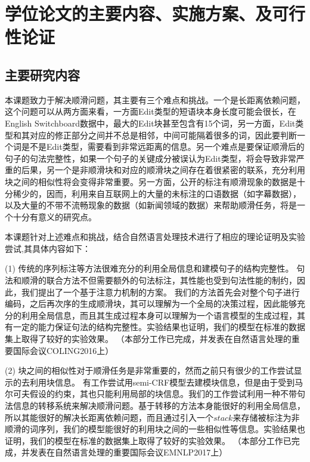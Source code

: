 
\section{学位论文的主要内容、实施方案、及可行性论证}

\subsection{主要研究内容}


本课题致力于解决顺滑问题，其主要有三个难点和挑战。一个是长距离依赖问题，这个问题可以从两方面来看，一方面Edit类型的短语块本身长度可能会很长，在English Switchboard数据中，最大的Edit块甚至包含有15个词，另一方面，Edit类型和其对应的修正部分之间并不总是相邻，中间可能隔着很多的词，因此要判断一个词是不是Edit类型，需要看到非常远距离的信息。另一个难点是要保证顺滑后的句子的句法完整性，如果一个句子的关键成分被误认为Edit类型，将会导致非常严重的后果，另一个是非顺滑块和对应的顺滑块之间存在着很紧密的联系，充分利用块之间的相似性将会变得非常重要。另一方面，公开的标注有顺滑现象的数据是十分稀少的，因而，利用来自互联网上的大量的未标注的口语数据（如字幕数据），以及大量的不带不流畅现象的数据（如新闻领域的数据）来帮助顺滑任务，将是一个十分有意义的研究点。


本课题针对上述难点和挑战，结合自然语言处理技术进行了相应的理论证明及实验尝试,其具体内容如下：

(1)
传统的序列标注等方法很难充分的利用全局信息和建模句子的结构完整性。
句法和顺滑的联合方法不但需要额外的句法标注，其性能也受到句法性能的制约，因此，我们提出了一个基于注意力机制的方案。
我们的方法首先会对整个句子进行编码，之后再次序的生成顺滑块，其可以理解为一个全局的决策过程，因此能够充分的利用全局信息，而且其生成过程本身可以理解为一个语言模型的生成过程，其有一定的能力保证句法的结构完整性。实验结果也证明，我们的模型在标准的数据集上取得了较好的实验效果。
（本部分工作已完成，并发表在自然语言处理的重要国际会议COLING2016上）

(2)
块之间的相似性对于顺滑任务是非常重要的，然而之前只有很少的工作尝试显示的去利用块信息。
有工作尝试用semi-CRF模型去建模块信息，但是由于受到马尔可夫假设的约束，其也只能利用局部的块信息。我们的工作尝试利用一种不带句法信息的转移系统来解决顺滑问题。基于转移的方法本身能很好的利用全局信息，所以其能很好的解决长距离依赖问题，而且通过引入一个$stack$来存储被标注为非顺滑的词序列，我们的模型能很好的利用块之间的一些相似性等信息。实验结果也证明，我们的模型在标准的数据集上取得了较好的实验效果。
（本部分工作已完成，并发表在自然语言处理的重要国际会议EMNLP2017上）



